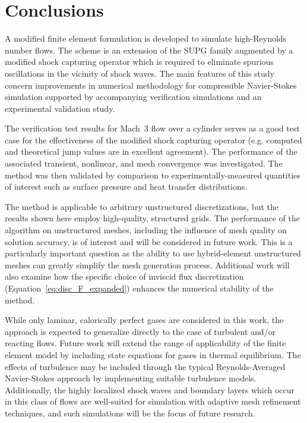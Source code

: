 \chapter{Conclusions\label{sec:conclusions}}
A modified finite element formulation is developed to simulate high-Reynolds number flows.  The scheme is an extension of the SUPG family augmented by a modified shock capturing operator which is required to eliminate spurious oscillations in the vicinity of shock waves.  The main features of this study concern improvements in numerical methodology for compressible Navier-Stokes simulation supported by accompanying verification simulations and an experimental validation study. 

 The verification test results for Mach~3 flow over a cylinder serves as a good test case for the effectiveness of the modified shock capturing operator (e.g. computed and theoretical jump values are in excellent agreement). The performance of the associated  transient, nonlinear, and mesh convergence was investigated.  The method was then validated by comparison to experimentally-measured quantities of interest such as surface pressure and heat transfer distributions.

The method is applicable to arbitrary unstructured discretizations, but the results shown here employ high-quality, structured grids.  The performance of the algorithm on unstructured meshes, including the influence of mesh quality on solution accuracy, is of interest and will be considered in future work.  This is a particularly important question as the ability to use hybrid-element unstructured meshes can greatly simplify the mesh generation process. Additional work will also examine how the specific choice of inviscid flux discretization (Equation~\eqref{eq:disc_F_expanded}) enhances the numerical stability of the method.

While only laminar, calorically perfect gases are considered in this work, the approach is expected to generalize directly to the case of turbulent and/or reacting flows.  Future work will extend the range of applicability of the finite element model by including state equations for gases in thermal equilibrium.  The effects of turbulence may be included through the typical Reynolds-Averaged Navier-Stokes approach by implementing suitable turbulence models.   Additionally, the highly localized shock waves and boundary layers which occur in this class of flows are well-suited for simulation with adaptive mesh refinement techniques, and such simulations will be the focus of future research.


